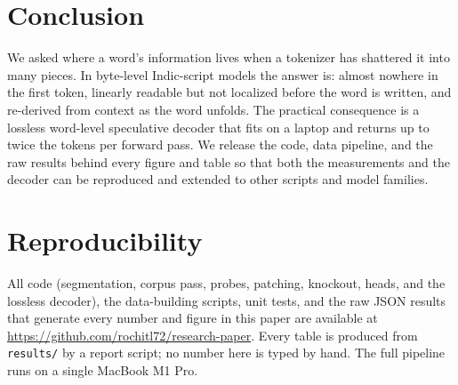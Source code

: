 \documentclass[11pt]{article}
\begin{document}
\section{Conclusion}

We asked where a word's information lives when a tokenizer has shattered it into
many pieces. In byte-level Indic-script models the answer is: almost nowhere in
the first token, linearly readable but not localized before the word is written,
and re-derived from context as the word unfolds. The practical consequence is a
lossless word-level speculative decoder that fits on a laptop and returns up to
twice the tokens per forward pass. We release the code, data pipeline, and the
raw results behind every figure and table so that both the measurements and the
decoder can be reproduced and extended to other scripts and model families.

\section*{Reproducibility}

All code (segmentation, corpus pass, probes, patching, knockout, heads, and the
lossless decoder), the data-building scripts, unit tests, and the raw JSON
results that generate every number and figure in this paper are available at
\url{https://github.com/rochitl72/research-paper}. Every table is produced from
\texttt{results/} by a report script; no number here is typed by hand. The full
pipeline runs on a single MacBook M1 Pro.


\end{document}

